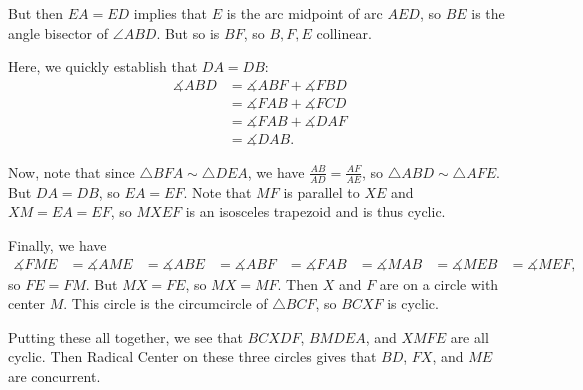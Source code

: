 But then $EA=ED$ implies that $E$ is the arc midpoint of arc $AED$, so $BE$ is the angle bisector of $\angle{ABD}$. But so is $BF$, so $B,F,E$ collinear.

Here, we quickly establish that $DA=DB$: \begin{align*}\measuredangle{ABD}&=\measuredangle{ABF}+\measuredangle{FBD}\\&=\measuredangle{FAB}+\measuredangle{FCD}\\&=\measuredangle{FAB}+\measuredangle{DAF}\\&=\measuredangle{DAB}.\end{align*}

Now, note that since $\triangle{BFA}\sim\triangle{DEA}$, we have $\frac{AB}{AD}=\frac{AF}{AE}$, so $\triangle{ABD}\sim\triangle{AFE}$. But $DA=DB$, so $EA=EF$. Note that $MF$ is parallel to $XE$ and $XM=EA=EF$, so $MXEF$ is an isosceles trapezoid and is thus cyclic.

Finally, we have \begin{align*}\measuredangle{FME}&=\measuredangle{AME}&=\measuredangle{ABE}&=\measuredangle{ABF}&=\measuredangle{FAB}&=\measuredangle{MAB}&=\measuredangle{MEB}&=\measuredangle{MEF},\end{align*} so $FE=FM$. But $MX=FE$, so $MX=MF$. Then $X$ and $F$ are on a circle with center $M$. This circle is the circumcircle of $\triangle{BCF}$, so $BCXF$ is cyclic.

Putting these all together, we see that $BCXDF$, $BMDEA$, and $XMFE$ are all cyclic. Then Radical Center on these three circles gives that $BD$, $FX$, and $ME$ are concurrent.